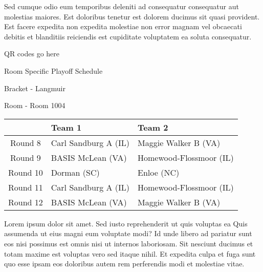 \documentclass{article}%
\begin{document}
\newline%
Sed cumque odio eum temporibus deleniti ad consequatur consequatur aut molestias maiores. Est doloribus tenetur est dolorem ducimus sit quasi provident. Est facere expedita non expedita molestiae non error magnam vel obcaecati debitis et blanditiis reiciendis est cupiditate voluptatem ea soluta consequatur.%
\vspace*{140pt}%
\begin{center}%
\begin{Huge}%
QR codes go here%
\end{Huge}%
\end{center}%
\newpage%
\begin{center}%
\begin{Huge}%
Room Specific Playoff Schedule%
\end{Huge}%
\vspace*{8pt}%
\linebreak%
\begin{Large}%
Bracket {-} Langmuir%
\end{Large}%
\vspace*{8pt}%
\linebreak%
\vspace*{8pt}%
\begin{Large}%
Room {-} Room 1004%
\end{Large}%
\end{center}%
%
\begin{tabularx}{\textwidth}{|c|Y|Y|}%
\hline%
&Team 1&Team 2\\%
\hline%
Round 8&Carl Sandburg A (IL)&Maggie Walker B (VA)\\%
Round 9&BASIS McLean (VA)&Homewood{-}Flossmoor (IL)\\%
Round 10&Dorman (SC)&Enloe (NC)\\%
Round 11&Carl Sandburg A (IL)&Homewood{-}Flossmoor (IL)\\%
Round 12&BASIS McLean (VA)&Maggie Walker B (VA)\\%
\hline%
\end{tabularx}%
\vspace*{8pt}%
\newline%
Lorem ipsum dolor sit amet. Sed iusto reprehenderit ut quis voluptas ea Quis assumenda ut eius magni eum voluptate modi? Id unde libero ad pariatur sunt eos nisi possimus est omnis nisi ut internos laboriosam. Sit nesciunt ducimus et totam maxime est voluptas vero sed itaque nihil. Et expedita culpa et fuga sunt quo esse ipsam eos doloribus autem rem perferendis modi et molestiae vitae.\newline%
\end{document}
